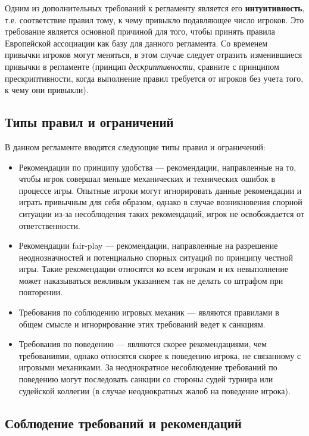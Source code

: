 \begin{additional}
\vspace{0.3cm}

Одним из дополнительных требований к регламенту является его \textbf{интуитивность}, т.е. соответствие правил тому, к чему привыкло подавляющее число игроков. Это требование является основной причиной для того, чтобы принять правила Европейской ассоциации как базу для данного регламента. Со временем привычки игроков могут меняться, в этом случае следует отразить изменившиеся привычки в регламенте (принцип \textit{дескриптивности}, сравните с принципом прескриптивности, когда выполнение правил требуется от игроков без учета того, к чему они привыкли).

\subsection{Типы правил и ограничений}

В данном регламенте вводятся следующие типы правил и ограничений:
\begin{itemize}
	\item Рекомендации по принципу удобства --- рекомендации, направленные на то, чтобы игрок совершал меньше механических и технических ошибок в процессе игры. Опытные игроки могут игнорировать данные рекомендации и играть привычным для себя образом, однако в случае возникновения спорной ситуации из-за несоблюдения таких рекомендаций, игрок не освобождается от ответственности.
	\item Рекомендации fair-play --- рекомендации, направленные на разрешение неоднозначностей и потенциально спорных ситуаций по принципу честной игры. Такие рекомендации относятся ко всем игрокам и их невыполнение может наказываться вежливым указанием так не делать со штрафом при повторении.
	\item Требования по соблюдению игровых механик --- являются правилами в общем смысле и игнорирование этих требований ведет к санкциям.
	\item Требования по поведению --- являются скорее рекомендациями, чем требованиями, однако относятся скорее к поведению игрока, не связанному с игровыми механиками. За неоднократное несоблюдение требований по поведению могут последовать санкции со стороны судей турнира или судейской коллегии (в случае неоднократных жалоб на поведение игрока).
\end{itemize}

\subsection{Соблюдение требований и рекомендаций}


\end{additional}
